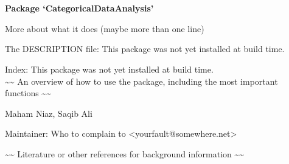 \documentclass[letterpaper]{book}
\begin{document}
\chapter*{}
\begin{center}
{\textbf{\huge Package `CategoricalDataAnalysis'}}
\par\bigskip{\large \today}
\end{center}
\begin{description}
\raggedright{}
\item[Type]
\item[Title]
\item[Version]
\item[Date]
\item[Author]
\item[Maintainer]\AsIs{}
\item[Description]
\item[License]
\end{description}
%
\begin{Description}\relax
More about what it does (maybe more than one line)
\end{Description}
%
\begin{Details}\relax

The DESCRIPTION file:
This package was not yet installed at build time.\\{}

Index:  This package was not yet installed at build time.\\{}
\textasciitilde{}\textasciitilde{} An overview of how to use the package, including the most important functions \textasciitilde{}\textasciitilde{}
\end{Details}
%
\begin{Author}\relax
Maham Niaz, Saqib Ali

Maintainer: Who to complain to <yourfault@somewhere.net>
\end{Author}
%
\begin{References}\relax
\textasciitilde{}\textasciitilde{} Literature or other references for background information \textasciitilde{}\textasciitilde{}
\end{References}
\end{document}

